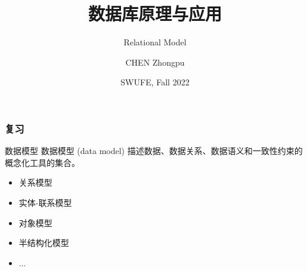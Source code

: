 \documentclass[aspectratio=169, 14pt]{beamer}
\title[Database Principles and Applications] %
{数据库原理与应用}
\subtitle{Relational Model}
\author[CHEN Zhongpu] %
{CHEN Zhongpu}
\institute[] %
{
  School of Computing and Artificial Intelligence \\
  \href{mailto:zpchen@swufe.edu.cn}{zpchen@swufe.edu.cn}
}
\date[] %
{SWUFE, Fall 2022}
\begin{document}
\frame{\titlepage}

\begin{frame}
    \frametitle{复习}
    \begin{block}{数据模型}
        数据模型 (data model) 描述数据、数据关系、数据语义和一致性约束的概念化工具的集合。
    \end{block}
    \begin{itemize}
        \item \alert{关系模型}
        \item 实体-联系模型
        \item 对象模型
        \item 半结构化模型
        \item ...        
    \end{itemize}
\end{frame}
\end{document}

